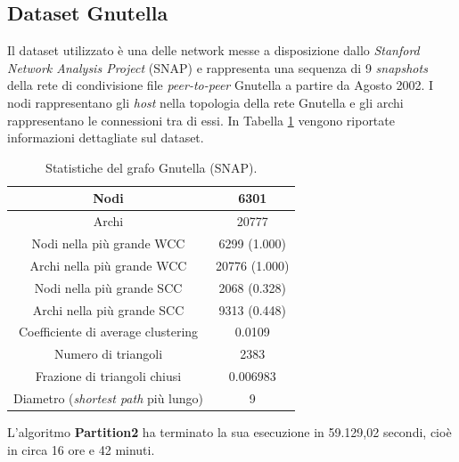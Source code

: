 \subsection{Dataset Gnutella}
Il dataset utilizzato è una delle network messe a disposizione dallo \textit{Stanford Network Analysis Project} (SNAP) \cite{snapnets} e rappresenta una sequenza di 9 \textit{snapshots} della rete di condivisione file \textit{peer-to-peer} Gnutella a partire da Agosto 2002. I nodi rappresentano gli \textit{host} nella topologia della rete Gnutella e gli archi rappresentano le connessioni tra di essi. In Tabella \ref{tab:gnutella} vengono riportate informazioni dettagliate sul dataset.
\begin{table}[h!]
	\centering
	\begin{tabular}{|c|c|}
		\hline
		Nodi& 6301\\ \hline
		Archi& 20777\\ \hline
		Nodi nella più grande WCC& 6299 (1.000)\\ \hline
		Archi nella più grande WCC& 20776 (1.000)\\ \hline
		Nodi nella più grande SCC& 2068 (0.328)\\ \hline
		Archi nella più grande SCC& 9313 (0.448)\\ \hline
		Coefficiente di average clustering& 0.0109\\ \hline
		Numero di triangoli& 2383\\ \hline
		Frazione di triangoli chiusi& 0.006983\\ \hline
		Diametro (\textit{shortest path} più lungo)& 9\\ \hline
	\end{tabular}
	\caption{Statistiche del grafo Gnutella (SNAP).}\label{tab:gnutella}
\end{table}

L'algoritmo \textbf{Partition2} ha terminato la sua esecuzione in 59.129,02 secondi, cioè in circa 16 ore e 42 minuti.
